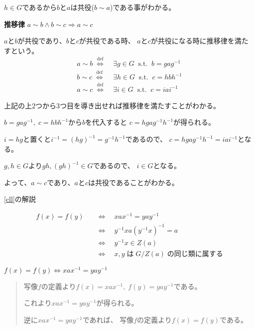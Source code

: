 \documentclass[12pt,b5paper]{ltjsarticle}
\begin{document}
$h\in G$であるから$b$と$a$は共役($b\sim a$)である事がわかる。



\textbf{推移律}
$a \sim b \land b\sim c \Rightarrow a \sim c$

$a$と$b$が共役であり、$b$と$c$が共役である時、
$a$と$c$が共役になる時に推移律を満たすという。
\begin{align}
 a \sim b \; \overset{\mathrm{def}}{\Longleftrightarrow} & \;
  \exists g \in G \;\; \mathrm{s.t.} \;\; b=gag^{-1}\\
 b \sim c \; \overset{\mathrm{def}}{\Longleftrightarrow} & \;
  \exists h \in G \;\; \mathrm{s.t.} \;\; c=hbh^{-1}\\
 a \sim c \; \overset{\mathrm{def}}{\Longleftrightarrow} & \;
  \exists i \in G \;\; \mathrm{s.t.} \;\; c=iai^{-1}
\end{align}

上記の上2つから3つ目を導き出せれば推移律を満たすことがわかる。

$b=gag^{-1},\; c=hbh^{-1}$から$b$を代入すると
$c=hgag^{-1}h^{-1}$が得られる。

$i=hg$と置くと$i^{-1}=(hg)^{-1} = g^{-1}h^{-1}$であるので、
$c=hgag^{-1}h^{-1} = iai^{-1}$となる。

$g,h\in G$より$gh, (gh)^{-1}\in G$であるので、
$i\in G$となる。

よって、$a\sim c$であり、$a$と$c$は共役であることがわかる。

\dotfill

\eqref{cll}の解説

\begin{align}
 f(x)=f(y) \quad
 & \Longleftrightarrow \quad xax^{-1} = yay^{-1}\\
 & \Longleftrightarrow \quad y^{-1}xa(y^{-1}x)^{-1} = a\\
 & \Longleftrightarrow \quad y^{-1}x \in Z(a)\\
 & \Longleftrightarrow \quad x,y \; は \; G/Z(a) \; の同じ類に属する
\end{align}

$f(x)=f(y) \Longleftrightarrow xax^{-1} = yay^{-1}$
\begin{quote}
 写像$f$の定義より$f(x)=xax^{-1},\;f(y)=yay^{-1}$である。

 これより$xax^{-1}=yay^{-1}$が得られる。

 逆に$xax^{-1}=yay^{-1}$であれば、
 写像$f$の定義より$f(x)=f(y)$である。
\end{quote}
\end{document}
